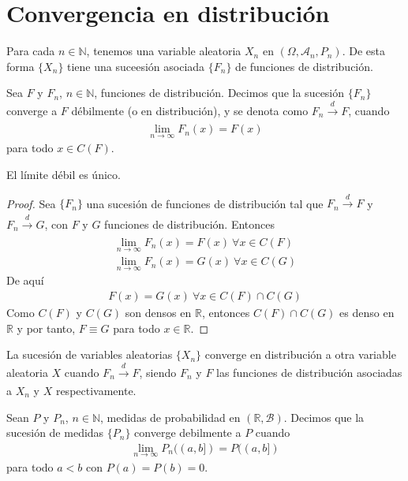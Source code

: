 \section{Convergencia en distribución}

Para cada $n \in \mathbb{N}$, tenemos una variable aleatoria $X_n$ en $(\Omega, \mathcal{A}_n, P_n)$. De esta forma $\{X_n\}$ tiene una suceesión asociada $\{F_n\}$ de funciones de distribución.
\begin{defi}
    Sea $F$ y $F_n$, $n \in \mathbb{N}$, funciones de distribución. Decimos que la sucesión $\{F_n\}$ converge a $F$ débilmente (o en distribución), y se denota como $F_n \xrightarrow[]{d} F$, cuando
    \begin{align*}
        \lim_{n \to \infty} F_n(x) = F(x)
    \end{align*}
    para todo $x \in C(F)$.
\end{defi}

\begin{teo}
    El límite débil es único.
\end{teo}

\begin{proof}
    Sea $\{F_n\}$ una sucesión de funciones de distribución tal que $F_n \xrightarrow[]{d} F$ y $F_n \xrightarrow[]{d} G$, con $F$ y $G$ funciones de distribución. Entonces
    \begin{align*}
        \lim_{n \to \infty} F_n(x) = F(x) \ \forall x \in C(F) \\
        \lim_{n \to \infty} F_n(x) = G(x) \ \forall x \in C(G)
    \end{align*}
    De aquí
    \begin{align*}
        F(x) = G(x) \ \forall x \in C(F) \cap C(G)
    \end{align*}
    Como $C(F)$ y $C(G)$ son densos en $\mathbb{R}$, entonces $C(F) \cap C(G)$ es denso en $\mathbb{R}$ y por tanto, $F \equiv G$ para todo $x \in \mathbb{R}$.
\end{proof}

\begin{defi}
    La sucesión de variables aleatorias $\{X_n\}$ converge en distribución a otra variable aleatoria $X$ cuando $F_n \xrightarrow[]{d} F$, siendo $F_n$ y $F$ las funciones de distribución asociadas a $X_n$ y $X$ respectivamente.
\end{defi}

\begin{defi}
    Sean $P$ y $P_n$, $n \in \mathbb{N}$, medidas de probabilidad en $(\mathbb{R}, \mathcal{B})$. Decimos que la sucesión de medidas $\{P_n\}$ converge debilmente a $P$ cuando
    \begin{align*}
        \lim_{n \to \infty} P_n((a,b]) = P((a,b])
    \end{align*}
    para todo $a < b$ con $P(a) = P(b) = 0$.
\end{defi}

